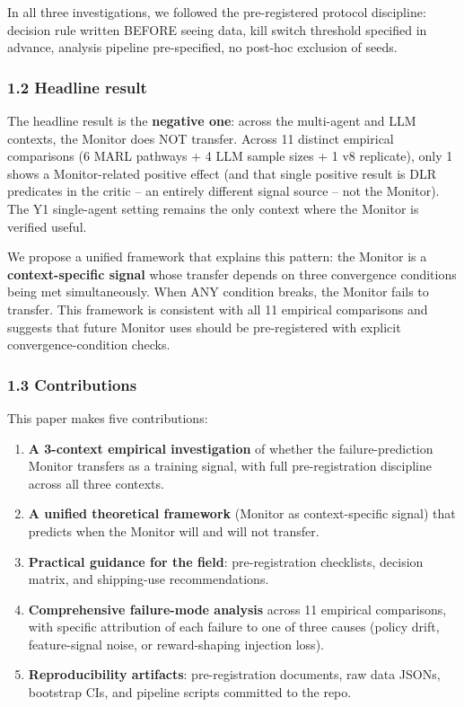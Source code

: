 \documentclass[
]{article}
\providecommand{\tightlist}{%
  \setlength{\itemsep}{0pt}\setlength{\parskip}{0pt}}
\begin{document}
In all three investigations, we followed the pre-registered protocol
discipline: decision rule written BEFORE seeing data, kill switch
threshold specified in advance, analysis pipeline pre-specified, no
post-hoc exclusion of seeds.

\subsubsection{1.2 Headline result}\label{headline-result}

The headline result is the \textbf{negative one}: across the multi-agent
and LLM contexts, the Monitor does NOT transfer. Across 11 distinct
empirical comparisons (6 MARL pathways + 4 LLM sample sizes + 1 v8
replicate), only 1 shows a Monitor-related positive effect (and that
single positive result is DLR predicates in the critic -- an entirely
different signal source -- not the Monitor). The Y1 single-agent setting
remains the only context where the Monitor is verified useful.

We propose a unified framework that explains this pattern: the Monitor
is a \textbf{context-specific signal} whose transfer depends on three
convergence conditions being met simultaneously. When ANY condition
breaks, the Monitor fails to transfer. This framework is consistent with
all 11 empirical comparisons and suggests that future Monitor uses
should be pre-registered with explicit convergence-condition checks.

\subsubsection{1.3 Contributions}\label{contributions}

This paper makes five contributions:

\begin{enumerate}
\def\labelenumi{\arabic{enumi}.}
\tightlist
\item
  \textbf{A 3-context empirical investigation} of whether the
  failure-prediction Monitor transfers as a training signal, with full
  pre-registration discipline across all three contexts.
\item
  \textbf{A unified theoretical framework} (Monitor as context-specific
  signal) that predicts when the Monitor will and will not transfer.
\item
  \textbf{Practical guidance for the field}: pre-registration
  checklists, decision matrix, and shipping-use recommendations.
\item
  \textbf{Comprehensive failure-mode analysis} across 11 empirical
  comparisons, with specific attribution of each failure to one of three
  causes (policy drift, feature-signal noise, or reward-shaping
  injection loss).
\item
  \textbf{Reproducibility artifacts}: pre-registration documents, raw
  data JSONs, bootstrap CIs, and pipeline scripts committed to the repo.
\end{enumerate}
\end{document}
